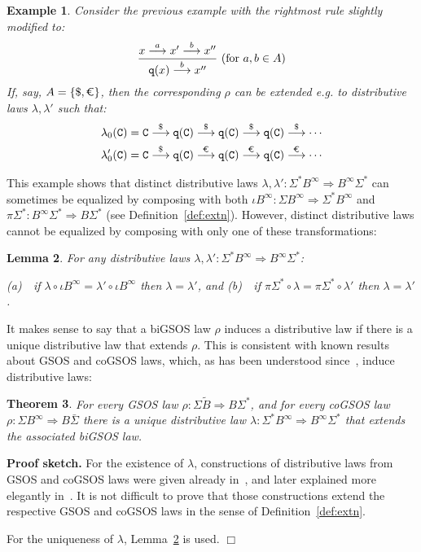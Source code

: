 \documentclass[adraft,copyright,creativecommons]{eptcs}
\newtheorem{theorem}{Theorem}
\newtheorem{example}[theorem]{Example}
\newtheorem{lemma}[theorem]{Lemma}
\newenvironment{proof}[1][Proof]{\noindent\textbf{#1.} }{{\hfill $\Box$ \\}}
\newcommand{\To}{\Longrightarrow}
\newcommand{\Bid}{\tilde{B}}
\newcommand{\Bb}{B^{\infty}}
\newcommand{\Sid}{\bar{\S}}
\newcommand{\Ss}{\Sigma^*}
\renewcommand{\S}{\Sigma}
\newcommand{\goes}[1]{\stackrel{#1}{\longrightarrow}}
\newcommand{\labA}{\$}
\newcommand{\labB}{\text{\euro}}
\begin{document}
\begin{example}\label{ex:onvawrar}\rm
Consider the previous example with the rightmost rule slightly modified to:
\begin{align*}
	\dfrac{x\goes{a}x'\goes{b}x''}{{\tt q}(x)\goes{b}x''}\ (\mbox{for }a,b\in A)
\end{align*}
If, say, $A=\{\labA,\labB\}$, then the corresponding $\rho$ can be extended e.g. to distributive laws $\lambda,\lambda'$ such that:
\begin{align*}
\lambda_0({\tt C}) &= {\tt C}\goes{\labA}{\tt q(C)}\goes{\labA}{\tt q(C)}\goes{\labA}{\tt q(C)}\goes{\labA}\cdots \\
\lambda'_0({\tt C}) &= {\tt C}\goes{\labA}{\tt q(C)}\goes{\labB}{\tt q(C)}\goes{\labB}{\tt q(C)}\goes{\labB}\cdots \\
\end{align*}
\end{example}

This example shows that distinct distributive laws $\lambda,\lambda':\Ss\Bb\To\Bb\Ss$ can sometimes be equalized by composing with both $\iota\Bb:\S\Bb\To\Ss\Bb$ and $\pi\Ss:\Bb\Ss\To B\Ss$ (see Definition~\ref{def:extn}). However, distinct distributive laws cannot be equalized by composing with only one of these transformations:

\begin{lemma}\label{lem:wonvaev}\rm
For any distributive laws $\lambda,\lambda':\Ss\Bb\To\Bb\Ss$:
\begin{center}
 (a)\ \ if $\lambda\circ\iota\Bb=\lambda'\circ\iota\Bb$ then $\lambda=\lambda'$, \qquad and \qquad (b)\ \  if $\pi\Ss\circ\lambda=\pi\Ss\circ\lambda'$ then $\lambda=\lambda'$.
\end{center}
\end{lemma}

It makes sense to say that a biGSOS law $\rho$ induces a distributive law if there is a unique distributive law that extends $\rho$. This is consistent with known results about GSOS and coGSOS laws, which, as has been understood since~\cite{turiplotkin}, induce distributive laws:

\begin{theorem}\label{thm:GSOSextends}\rm
For every GSOS law $\rho:\S\Bid\To B\Ss$, and for every coGSOS law $\rho:\S\Bb\To B\Sid$  there is a unique distributive law $\lambda:\Ss\Bb\To\Bb\Ss$ that extends the associated biGSOS law.
\end{theorem}

\begin{proof}[Proof sketch]
For the existence of $\lambda$, constructions of distributive laws from GSOS and coGSOS laws were given already in~\cite{turiplotkin}, and later explained more elegantly in~\cite{lenisapowerwatanabe2}. It is not difficult to prove that those constructions extend the respective GSOS and coGSOS laws in the sense of Definition~\ref{def:extn}.

For the uniqueness of $\lambda$, Lemma~\ref{lem:wonvaev} is used.
\end{proof}
\end{document}
